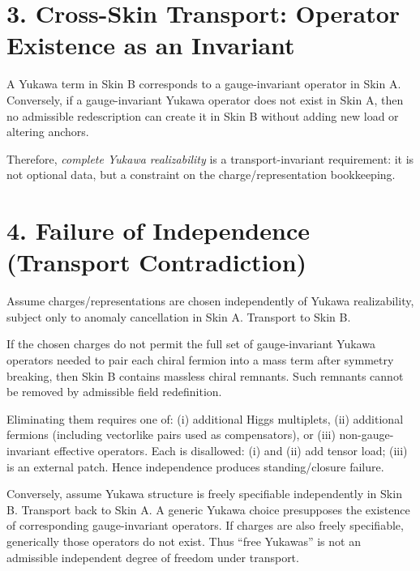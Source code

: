 ﻿\documentclass[11pt]{article}
\begin{document}
\section*{3. Cross-Skin Transport: Operator Existence as an Invariant}
A Yukawa term in Skin B corresponds to a gauge-invariant operator in Skin A.
Conversely, if a gauge-invariant Yukawa operator does not exist in Skin A,
then no admissible redescription can create it in Skin B without adding new load or altering anchors.

Therefore, \emph{complete Yukawa realizability} is a transport-invariant requirement:
it is not optional data, but a constraint on the charge/representation bookkeeping.

\section*{4. Failure of Independence (Transport Contradiction)}
Assume charges/representations are chosen independently of Yukawa realizability, subject only to anomaly cancellation in Skin A.
Transport to Skin B.

If the chosen charges do not permit the full set of gauge-invariant Yukawa operators needed to pair each chiral fermion
into a mass term after symmetry breaking, then Skin B contains massless chiral remnants.
Such remnants cannot be removed by admissible field redefinition.

Eliminating them requires one of:
(i) additional Higgs multiplets,
(ii) additional fermions (including vectorlike pairs used as compensators), or
(iii) non-gauge-invariant effective operators.
Each is disallowed: (i) and (ii) add tensor load; (iii) is an external patch.
Hence independence produces standing/closure failure.

Conversely, assume Yukawa structure is freely specifiable independently in Skin B.
Transport back to Skin A.
A generic Yukawa choice presupposes the existence of corresponding gauge-invariant operators.
If charges are also freely specifiable, generically those operators do not exist.
Thus ``free Yukawas'' is not an admissible independent degree of freedom under transport.
\end{document}
